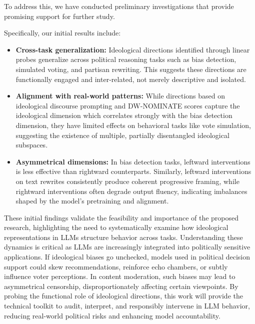 \documentclass[11pt]{article}
\begin{document}
To address this, we have conducted preliminary investigations that provide promising support for further study.

Specifically, our initial results include:

\begin{itemize}
\item \textbf{Cross-task generalization:} Ideological directions identified through linear probes generalize across political reasoning tasks such as bias detection, simulated voting, and partisan rewriting. This suggests these directions are functionally engaged and inter-related, not merely descriptive and isolated.

\item \textbf{Alignment with real-world patterns:} While directions based on ideological discourse prompting and DW-NOMINATE scores \citep{carrollMeasuringBiasUncertainty2009} capture the ideological dimension which correlates strongly with the bias detection dimension, they have limited effects on behavioral tasks like vote simulation, suggesting the existence of multiple, partially disentangled ideological subspaces.

\item \textbf{Asymmetrical dimensions:} In bias detection tasks, leftward interventions is less effective than rightward counterparts. Similarly, leftward interventions on text rewrites consistently produce coherent progressive framing, while rightward interventions often degrade output fluency, indicating imbalances shaped by the model’s pretraining and alignment.

\end{itemize}

These initial findings validate the feasibility and importance of the proposed research, highlighting the need to systematically examine how ideological representations in LLMs structure behavior across tasks. Understanding these dynamics is critical as LLMs are increasingly integrated into politically sensitive applications. If ideological biases go unchecked, models used in political decision support could skew recommendations, reinforce echo chambers, or subtly influence voter perceptions. In content moderation, such biases may lead to asymmetrical censorship, disproportionately affecting certain viewpoints. By probing the functional role of ideological directions, this work will provide the technical toolkit to audit, interpret, and responsibly intervene in LLM behavior, reducing real-world political risks and enhancing model accountability.
\end{document}
